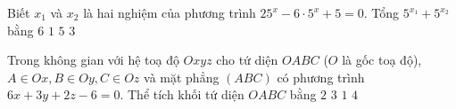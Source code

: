 \begin{ex}%
	Biết $x_{1}$ và $x_{2}$ là hai nghiệm của phương trình $25^x-6\cdot 5^x+5=0$. Tổng $5^{x_{1}}+5^{x_{2}}$ bằng
	\choice
	{\True $6$}
	{$1$}
	{$5$}
	{$3$}
\end{ex}

\begin{ex}%
	Trong không gian với hệ toạ độ $Oxyz$ cho tứ diện $OABC$ ($O$ là gốc toạ độ), $A\in Ox,B\in Oy,C\in Oz$ và mặt phẳng $(ABC)$ có phương trình $6x+3y+2z-6=0$. Thể tích khối tứ diện $OABC$ bằng
	\choice
	{$2$}
	{$3$}
	{\True $1$}
	{$4$}
\end{ex}

